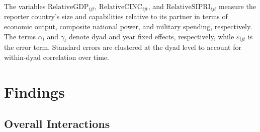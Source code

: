 \documentclass[12pt]{article}
\begin{document}
The variables \( \text{RelativeGDP}_{ijt} \), \( \text{RelativeCINC}_{ijt} \), and \( \text{RelativeSIPRI}_{ijt} \) measure the reporter country's size and capabilities relative to its partner in terms of economic output, composite national power, and military spending, respectively. The terms \( \alpha_i \) and \( \gamma_t \) denote dyad and year fixed effects, respectively, while \( \varepsilon_{ijt} \) is the error term. Standard errors are clustered at the dyad level to account for within-dyad correlation over time.

\section{Findings}
\subsection{Overall Interactions}
\end{document}
